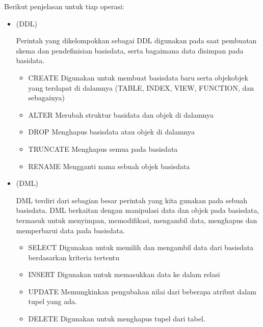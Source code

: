 \documentclass[letterpaper,10pt,english]{sphinxmanual}
\begin{document}
Berikut penjelasan untuk tiap operasi:
\begin{itemize}
\item {} 
 (DDL)

Perintah yang dikelompokkan sebagai DDL digunakan pada saat pembuatan skema dan pendefinisian basisdata, serta bagaimana data disimpan pada basidata.
\begin{itemize}
\item {} 
CREATE \sphinxhyphen{} Digunakan untuk membuat basisdata baru serta objek\sphinxhyphen{}objek yang terdapat di dalamnya (TABLE, INDEX, VIEW, FUNCTION, dan sebagainya)

\item {} 
ALTER \sphinxhyphen{} Merubah struktur basidata dan objek di dalamnya

\item {} 
DROP \sphinxhyphen{} Menghapus basisdata atau objek di dalamnya

\item {} 
TRUNCATE \sphinxhyphen{} Menghapus semua  pada basisdata

\item {} 
RENAME \sphinxhyphen{} Mengganti nama sebuah objek basisdata

\end{itemize}

\item {} 
 (DML)

DML terdiri dari sebagian besar perintah yang kita gunakan pada sebuah basisdata. DML berkaitan dengan manipulasi data dan objek pada basisdata, termasuk untuk menyimpan, memodifikasi, mengambil data, menghapus dan memperbarui data pada basisdata.
\begin{itemize}
\item {} 
SELECT \sphinxhyphen{} Digunakan untuk memilih dan mengambil data dari basisdata berdasarkan kriteria tertentu

\item {} 
INSERT \sphinxhyphen{} Digunakan untuk memasukkan data ke dalam relasi

\item {} 
UPDATE \sphinxhyphen{} Memungkinkan pengubahan nilai dari beberapa atribut dalam tupel yang ada.

\item {} 
DELETE \sphinxhyphen{} Digunakan untuk menghapus tupel dari tabel.


\end{itemize}
\end{itemize}
\end{document}

